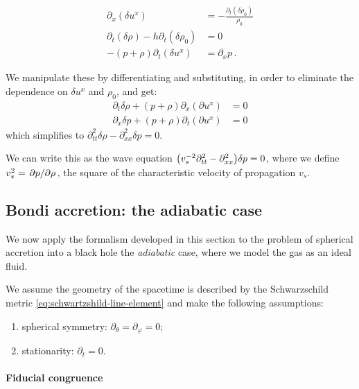 \documentclass[main.tex]{subfiles}
\begin{document}
\begin{subequations}
\begin{align}
  \partial_x (\delta u^x) &= -\frac{\partial_t (\delta \rho_0)}{\rho_0}  \\
  \partial_t (\delta \rho) - h \partial_t (\delta \rho_0) &= 0  \\
  -(p+ \rho) \partial_t (\delta u^x) &= \partial_x p \,.
\end{align}
\end{subequations}

We manipulate these by differentiating and substituting, in order to eliminate the dependence on \(\delta u^x\) and \(\rho_0\), and get:
\begin{subequations}
\begin{align}
  \partial_t \delta \rho + (p+\rho) \partial_x (\partial u^x) &= 0 \\
  \partial_x \delta p + (p+\rho) \partial_t (\partial u^x) &= 0
\end{align}
\end{subequations}
which simplifies to \(\partial_{tt}^2 \delta \rho - \partial_{xx}^2 \delta p = 0\).

We can write this as the wave equation \(\qty(v_s^{-2} \partial_{tt}^2 - \partial_{xx}^2 ) \delta p = 0\), where we define \(v_s^2 = \pdv*{p}{\rho}\), the square of the characteristic velocity of propagation \(v_s\).

\subsection{Bondi accretion: the adiabatic case}

We now apply the formalism developed in this section to the problem of spherical accretion into a black hole the \emph{adiabatic} case, where we model the gas as an ideal fluid.

We assume the geometry of the spacetime is described by the Schwarzschild metric \eqref{eq:schwartzshild-line-element} and make the following assumptions:

\begin{enumerate}
  \item spherical symmetry: \(\partial_\theta = \partial_\varphi = 0\);
  \item stationarity: \(\partial_t = 0\).
\end{enumerate}

\paragraph{Fiducial congruence}
\end{document}
